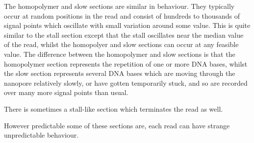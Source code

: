

The homopolymer and slow sections are similar in behaviour. They typically occur at random positions in the read and consist of hundreds to thousands of signal points which oscillate with small variation around some value. This is quite similar to the stall section except that the stall oscillates near the median value of the read, whilst the homopolyer and slow sections can occur at any feasible value. The difference between the homopolymer and slow sections is that the homopolymer section represents the repetition of one or more DNA bases, whilst the slow section represents several DNA bases which are moving through the nanopore relatively slowly, or have gotten temporarily stuck, and so are recorded over many more signal points than usual.





There is sometimes a stall-like section which terminates the read as well.




However predictable some of these sections are, each read can have strange unpredictable behaviour.


